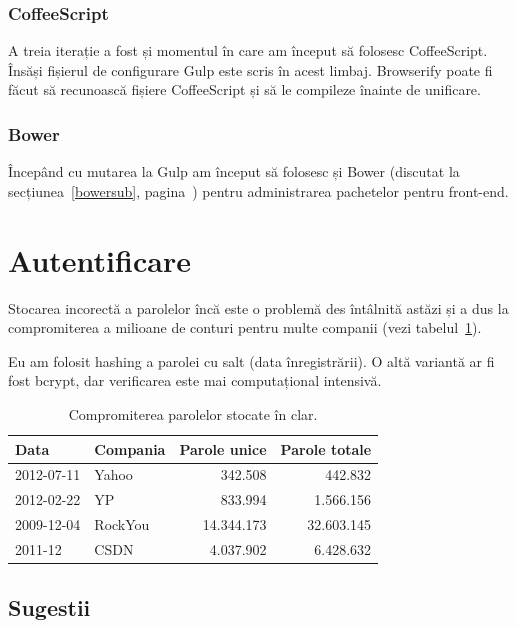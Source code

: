 \documentclass[a4wide,12pt]{report}
\newcommand{\eng}[1]{{#1}} %
\begin{document}
\subsubsection{CoffeeScript}

A treia iterație a fost și momentul în care am început să folosesc CoffeeScript.
Însăși fișierul de configurare Gulp este scris în acest limbaj. Browserify poate
fi făcut să recunoască fișiere CoffeeScript și să le compileze înainte de
unificare.

\subsubsection{Bower}

Începând cu mutarea la Gulp am început să folosesc și Bower (discutat la
secțiunea~\ref{bowersub}, pagina~\pageref{bowersub}) pentru administrarea
pachetelor pentru \eng{front-end}.

\section{Autentificare}

Stocarea incorectă a parolelor încă este o problemă des întâlnită astăzi și a
dus la compromiterea a milioane de conturi pentru multe companii (vezi
tabelul~\ref{paroletab}).

Eu am folosit \eng{hashing} a parolei cu \eng{salt} (data înregistrării). O altă
variantă ar fi fost bcrypt, dar verificarea este mai computațional intensivă.

\begin{table}[hb]
\begin{center}
\begin{tabular}{l l r r}
Data & Compania & Parole unice & Parole totale \\
\hline
2012-07-11 & Yahoo & 342.508 & 442.832 \\
2012-02-22 & YP & 833.994 & 1.566.156 \\
2009-12-04 & RockYou & 14.344.173 & 32.603.145 \\
2011-12 & CSDN & 4.037.902 & 6.428.632 \\
\end{tabular}
\end{center}
\caption{Compromiterea parolelor stocate în clar\cite{passleak}.}
\label{paroletab}
\end{table}

\subsection{Sugestii}
\end{document}
